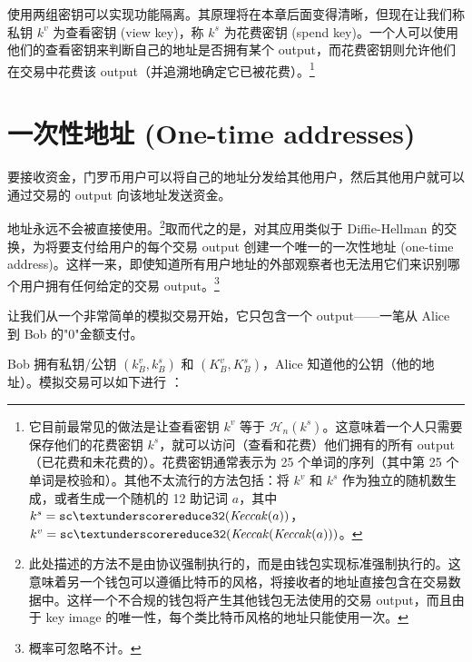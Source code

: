 使用两组密钥可以实现功能隔离。其原理将在本章后面变得清晰，但现在让我们称私钥 $k^v$ 为{查看密钥 (view key)}，称 $k^s$ 为{花费密钥 (spend key)}。一个人可以使用他们的查看密钥来判断自己的地址是否拥有某个 output，而花费密钥则允许他们在交易中花费该 output（并追溯地确定它已被花费）。\footnote{它目前最常见的做法是让查看密钥 $k^v$ 等于 $\mathcal{H}_n(k^s)$。这意味着一个人只需要保存他们的花费密钥 $k^s$，就可以访问（查看和花费）他们拥有的所有 output（已花费和未花费的）。花费密钥通常表示为 25 个单词的序列（其中第 25 个单词是校验和）。其他不太流行的方法包括：将 $k^v$ 和 $k^s$ 作为独立的随机数生成，或者生成一个随机的 12 助记词 $a$，其中 $k^s = {\tt sc\textunderscore reduce32}(\mathit{Keccak}(a))$，$k^v = {\tt sc\textunderscore reduce32}(\mathit{Keccak}(\mathit{Keccak}(a)))$。\cite{luigi-address}}



\section{一次性地址 (One-time addresses)}
\label{sec:one-time-addresses}

要接收资金，门罗币用户可以将自己的地址分发给其他用户，然后其他用户就可以通过交易的 output 向该地址发送资金。

地址永远不会被直接使用。\footnote{此处描述的方法不是由协议强制执行的，而是由钱包实现标准强制执行的。这意味着另一个钱包可以遵循比特币的风格，将接收者的地址直接包含在交易数据中。这样一个不合规的钱包将产生其他钱包无法使用的交易 output，而且由于 key image 的唯一性，每个类比特币风格的地址只能使用一次。}取而代之的是，对其应用类似于 Diffie-Hellman 的交换，为将要支付给用户的每个交易 output 创建一个唯一的{一次性地址 (one-time address)}。这样一来，即使知道所有用户地址的外部观察者也无法用它们来识别哪个用户拥有任何给定的交易 output。\footnote{概率可忽略不计。}


让我们从一个非常简单的模拟交易开始，它只包含一个 output——一笔从 Alice 到 Bob 的"0"金额支付。

Bob 拥有私钥/公钥 $(k_B^v, k_B^s)$ 和 $(K_B^v, K_B^s)$，Alice 知道他的公钥（他的地址）。模拟交易可以如下进行 \cite{cryptoNoteWhitePaper}：

